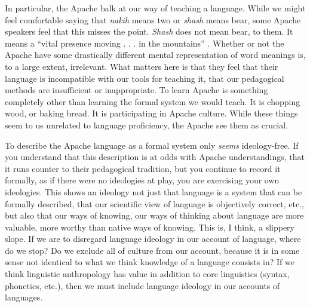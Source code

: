 \documentclass[man,12pt,natbib]{apa6}
\begin{document}
In particular, the Apache balk at our way of teaching a language. While we
might feel comfortable saying that \emph{nakih} means two or \emph{shash} means
bear, some Apache speakers feel that this misses the point. \emph{Shash} does
not mean bear, to them. It means a ``vital presence moving  . . . in the
mountains'' \citep[p.~283]{Nevins04}. Whether or not the Apache have some 
drastically different mental representation of word meanings is, to a large 
extent, irrelevant. What matters here is that they feel that their language
is incompatible with our tools for teaching it, that our pedagogical methods
are insufficient or inappropriate. To learn Apache is something completely 
other than learning the formal system we would teach. It is chopping wood, or
baking bread. It is participating in Apache culture. While these things seem to
us unrelated to language proficiency, the Apache see them as crucial.

To describe the Apache language as a formal system only \emph{seems}
ideology-free. If you understand that this description is at odds with Apache
understandings, that it runs counter to their pedagogical tradition, but you
continue to record it formally, as if there were no ideologies at play, you are
exercising your own ideologies. This shows an ideology not just that language
is a system that can be formally described, that our scientific view of
language is objectively correct, etc., but also that our ways of knowing, our
ways of thinking about language are more valuable, more worthy than native ways
of knowing. This is, I think, a slippery slope. If we are to disregard language 
ideology in our account of language, where do we stop? Do we exclude all of
culture from our account, because it is in some sense not identical to what we
think knowledge of a language consists in? If we think linguistic anthropology
has value in addition to core linguistics (syntax, phonetics, etc.), then we
must include language ideology in our accounts of languages.

\clearpage

\end{document}
